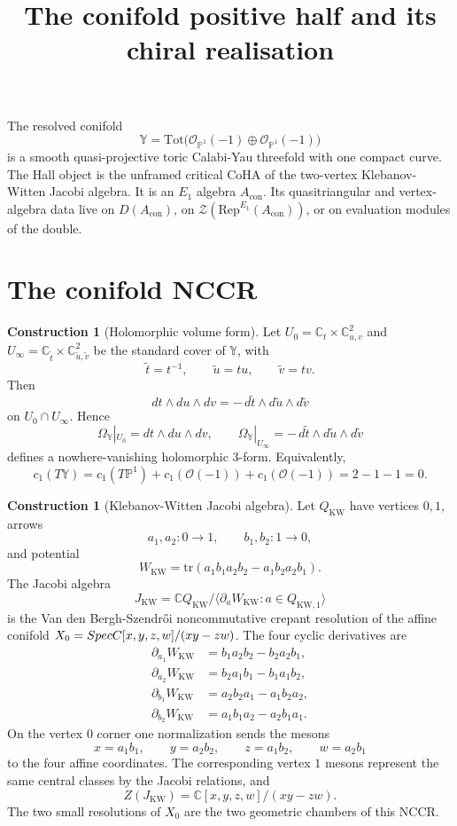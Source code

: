 \documentclass[11pt]{amsart}
\title{The conifold positive half and its chiral realisation}
\date{}
\providecommand{\C}{\mathbb{C}}
\providecommand{\bP}{\mathbb{P}}
\providecommand{\bY}{\mathbb{Y}}
\providecommand{\cO}{\mathcal{O}}
\providecommand{\Rep}{\mathrm{Rep}}
\providecommand{\Tot}{\mathrm{Tot}}
\providecommand{\Eone}{E_1}
\providecommand{\tr}{\mathrm{tr}}
\theoremstyle{plain}
\theoremstyle{definition}
\newtheorem{construction}[theorem]{Construction}
\theoremstyle{remark}
\begin{document}
\maketitle

The resolved conifold
\[
  \bY=\Tot\bigl(\cO_{\bP^1}(-1)\oplus\cO_{\bP^1}(-1)\bigr)
\]
is a smooth quasi-projective toric Calabi-Yau threefold with one compact
curve.  The Hall object is the unframed critical CoHA of the two-vertex
Klebanov-Witten Jacobi algebra.  It is an \(\Eone\)
algebra \(A_{\mathrm{con}}\).  Its quasitriangular and vertex-algebra
data live on \(D(A_{\mathrm{con}})\), on
\(\mathcal{Z}(\Rep^{\Eone}(A_{\mathrm{con}}))\), or on evaluation
modules of the double.

\section{The conifold NCCR}

\begin{construction}[Holomorphic volume form]\label{cons:conifold-volume-form}
Let \(U_0=\C_t\times\C^2_{u,v}\) and
\(U_\infty=\C_{\tilde t}\times\C^2_{\tilde u,\tilde v}\) be the standard
cover of \(\bY\), with
\[
  \tilde t=t^{-1},\qquad \tilde u=t u,\qquad \tilde v=t v .
\]
Then
\[
  dt\wedge du\wedge dv
  =
  -\,d\tilde t\wedge d\tilde u\wedge d\tilde v
\]
on \(U_0\cap U_\infty\).  Hence
\[
  \Omega_{\bY}|_{U_0}=dt\wedge du\wedge dv,\qquad
  \Omega_{\bY}|_{U_\infty}=-\,d\tilde t\wedge d\tilde u\wedge d\tilde v
\]
defines a nowhere-vanishing holomorphic \(3\)-form.  Equivalently,
\[
  c_1(T\bY)=c_1(T\bP^1)+c_1(\cO(-1))+c_1(\cO(-1))=2-1-1=0 .
\]
\end{construction}

\begin{construction}[Klebanov-Witten Jacobi algebra]\label{cons:kw-jacobi}
Let \(Q_{\mathrm{KW}}\) have vertices \(0,1\), arrows
\[
  a_1,a_2\colon 0\to 1,\qquad b_1,b_2\colon 1\to 0,
\]
and potential
\[
  W_{\mathrm{KW}}
  =
  \tr(a_1b_1a_2b_2-a_1b_2a_2b_1).
\]
The Jacobi algebra
\[
  J_{\mathrm{KW}}
  =
  \C Q_{\mathrm{KW}}\big/
  \langle \partial_a W_{\mathrm{KW}}:a\in Q_{\mathrm{KW},1}\rangle
\]
is the Van den Bergh-Szendr\H{o}i noncommutative crepant resolution of
the affine conifold \(X_0=\Spec \C[x,y,z,w]/(xy-zw)\).  The four cyclic
derivatives are
\[
\begin{aligned}
  \partial_{a_1}W_{\mathrm{KW}}&=b_1a_2b_2-b_2a_2b_1,\\
  \partial_{a_2}W_{\mathrm{KW}}&=b_2a_1b_1-b_1a_1b_2,\\
  \partial_{b_1}W_{\mathrm{KW}}&=a_2b_2a_1-a_1b_2a_2,\\
  \partial_{b_2}W_{\mathrm{KW}}&=a_1b_1a_2-a_2b_1a_1 .
\end{aligned}
\]
On the vertex \(0\) corner one normalization sends the mesons
\[
  x=a_1b_1,\qquad y=a_2b_2,\qquad z=a_1b_2,\qquad w=a_2b_1
\]
to the four affine coordinates.  The corresponding vertex \(1\) mesons
represent the same central classes by the Jacobi relations, and
\[
  Z(J_{\mathrm{KW}})=\C[x,y,z,w]/(xy-zw).
\]
The two small resolutions of \(X_0\) are the two geometric chambers of
this NCCR.
\end{construction}
\end{document}
